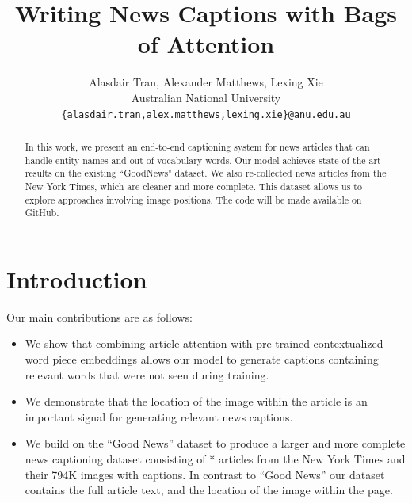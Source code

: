 \documentclass[10pt,twocolumn,letterpaper]{article}
\begin{document}
\title{Writing News Captions with Bags of Attention}

\author{Alasdair Tran, Alexander Matthews, Lexing Xie\\
Australian National University\\
{\tt\small \{alasdair.tran,alex.matthews,lexing.xie\}@anu.edu.au}
}

\maketitle

\begin{abstract}
   In this work, we present an end-to-end captioning system for news articles
   that can handle entity names and out-of-vocabulary words. Our model achieves
   state-of-the-art results on the existing ``GoodNews" dataset. We also
   re-collected news articles from the New York Times, which are cleaner and
   more complete. This dataset allows us to explore approaches involving
   image positions. The code will be made available on GitHub.
\end{abstract}

\section{Introduction}

Our main contributions are as follows:

\begin{itemize}
   \item We show that combining article attention with pre-trained contextualized
   word piece embeddings allows our model to generate captions containing
   relevant words that were not seen during training.

   \item We demonstrate that the location of the image within the article is an
   important signal for generating relevant news captions.

   \item We build on the “Good News” dataset to produce a larger and more complete
   news captioning dataset consisting of * articles from the New York Times and
   their 794K images with captions. In contrast to “Good News” our dataset
   contains the full article text, and the location of the image within the
   page.
\end{itemize}
\end{document}
